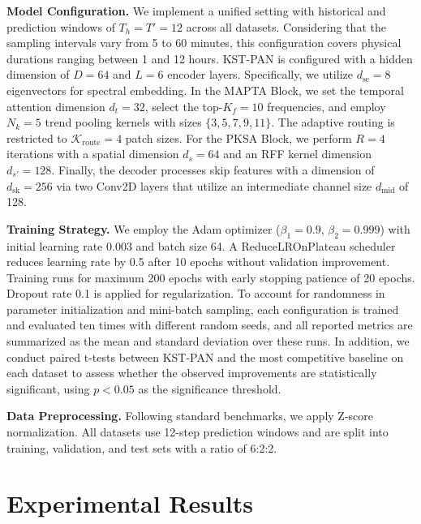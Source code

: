 \documentclass[5p,times,authoryear]{elsarticle}
\begin{document}
\textbf{Model Configuration.} We implement a unified setting with historical and prediction windows of $T_h = T' = 12$ across all datasets. Considering that the sampling intervals vary from 5 to 60 minutes, this configuration covers physical durations ranging between 1 and 12 hours. KST-PAN is configured with a hidden dimension of $D = 64$ and $L = 6$ encoder layers. Specifically, we utilize $d_{\mathrm{se}} = 8$ eigenvectors for spectral embedding. In the MAPTA Block, we set the temporal attention dimension $d_t = 32$, select the top-$K_f = 10$ frequencies, and employ $N_k = 5$ trend pooling kernels with sizes $\{3, 5, 7, 9, 11\}$. The adaptive routing is restricted to $\mathcal{K}_{\text{route}} = 4$ patch sizes. For the PKSA Block, we perform $R = 4$ iterations with a spatial dimension $d_s = 64$ and an RFF kernel dimension $d_{s'} = 128$. Finally, the decoder processes skip features with a dimension of $d_{\text{sk}} = 256$ via two Conv2D layers that utilize an intermediate channel size $d_{\text{mid}}$ of 128.


\textbf{Training Strategy.} We employ the Adam optimizer ($\beta_1=0.9$, $\beta_2=0.999$) with initial learning rate 0.003 and batch size 64. A ReduceLROnPlateau scheduler reduces learning rate by 0.5 after 10 epochs without validation improvement. Training runs for maximum 200 epochs with early stopping patience of 20 epochs. Dropout rate 0.1 is applied for regularization. To account for randomness in parameter initialization and mini-batch sampling, each configuration is trained and evaluated ten times with different random seeds, and all reported metrics are summarized as the mean and standard deviation over these runs. In addition, we conduct paired t-tests between KST-PAN and the most competitive baseline on each dataset to assess whether the observed improvements are statistically significant, using $p<0.05$ as the significance threshold.

\textbf{Data Preprocessing.} Following standard benchmarks\citep{li2018dcrnn,yu2018spatio}, we apply Z-score normalization. All datasets use 12-step prediction windows and are split into training, validation, and test sets with a ratio of 6:2:2.



\section{Experimental Results}

\end{document}

